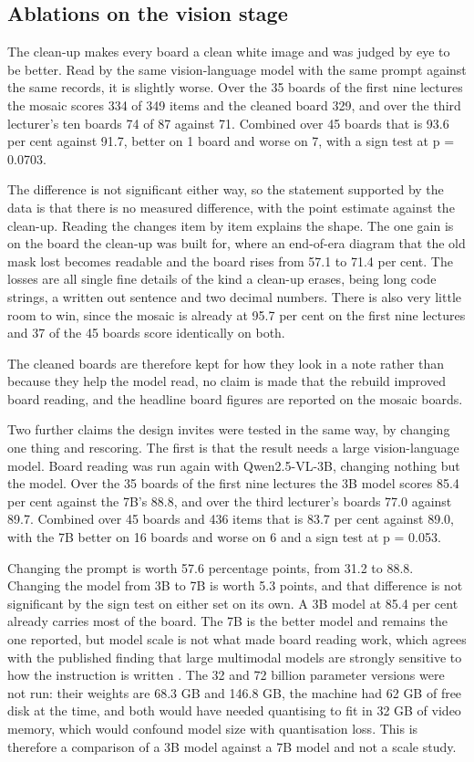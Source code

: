 \subsection{Ablations on the vision stage}
\label{sec:board-cleanup}

The clean-up makes every board a clean white image and was judged by eye to be better.
Read by the same vision-language model with the same prompt against the same records, it
is slightly worse. Over the 35 boards of the first nine lectures the mosaic scores 334 of
349 items and the cleaned board 329, and over the third lecturer's ten boards 74 of 87
against 71. Combined over 45 boards that is 93.6 per cent against 91.7, better on 1 board
and worse on 7, with a sign test at p = 0.0703.

The difference is not significant either way, so the statement supported by the data is
that there is no measured difference, with the point estimate against the clean-up.
Reading the changes item by item explains the shape. The one gain is on the board the
clean-up was built for, where an end-of-era diagram that the old mask lost becomes
readable and the board rises from 57.1 to 71.4 per cent. The losses are all single fine
details of the kind a clean-up erases, being long code strings, a written out sentence and
two decimal numbers. There is also very little room to win, since the mosaic is already at
95.7 per cent on the first nine lectures and 37 of the 45 boards score identically on
both.

The cleaned boards are therefore kept for how they look in a note rather than because they
help the model read, no claim is made that the rebuild improved board reading, and the
headline board figures are reported on the mosaic boards.

\label{sec:vlm-size}
Two further claims the design invites were tested in the same way, by changing one thing
and rescoring. The first is that the result needs a large vision-language model. Board
reading was run again with Qwen2.5-VL-3B, changing nothing but the model. Over the
35 boards of the first nine lectures the 3B model scores 85.4 per cent against the 7B's
88.8, and over the third lecturer's boards 77.0 against 89.7. Combined over 45 boards and
436 items that is 83.7 per cent against 89.0, with the 7B better on 16 boards and worse on
6 and a sign test at p = 0.053.

Changing the prompt is worth 57.6 percentage points, from 31.2 to 88.8. Changing the model
from 3B to 7B is worth 5.3 points, and that difference is not significant by the sign test
on either set on its own. A 3B model at 85.4 per cent already carries most of the board.
The 7B is the better model and remains the one reported, but model scale is not what made
board reading work, which agrees with the published finding that large multimodal models
are strongly sensitive to how the instruction is written
\cite{ismithdeen2025promptception}. The 32 and 72 billion parameter versions were not run:
their weights are 68.3 GB and 146.8 GB, the machine had 62 GB of free disk at the time,
and both would have needed quantising to fit in 32 GB of video memory, which would
confound model size with quantisation loss. This is therefore a comparison of a 3B model
against a 7B model and not a scale study.

